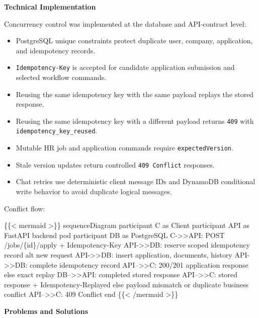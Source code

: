 \vspace{0.5em}\noindent\textbf{Technical Implementation}\par

Concurrency control was implemented at the database and API-contract
level:

\begin{itemize}
\tightlist
\item
  PostgreSQL unique constraints protect duplicate user, company,
  application, and idempotency records.
\item
  \texttt{Idempotency-\allowbreak{}Key} is accepted for candidate application
  submission and selected workflow commands.
\item
  Reusing the same idempotency key with the same payload replays the
  stored response.
\item
  Reusing the same idempotency key with a different payload returns
  \texttt{409} with \texttt{idempotency\_\allowbreak{}key\_\allowbreak{}reused}.
\item
  Mutable HR job and application commands require
  \texttt{expectedVersion}.
\item
  Stale version updates return controlled \texttt{409\ Conflict}
  responses.
\item
  Chat retries use deterministic client message IDs and DynamoDB
  conditional write behavior to avoid duplicate logical messages.
\end{itemize}

Conflict flow:

\{\{\textless{} mermaid \textgreater\}\} sequenceDiagram participant C
as Client participant API as FastAPI backend pod participant DB as
PostgreSQL C-\textgreater\textgreater API: POST /jobs/\{id\}/apply +
Idempotency-Key API-\textgreater\textgreater DB: reserve scoped
idempotency record alt new request API-\textgreater\textgreater DB:
insert application, documents, history API-\textgreater\textgreater DB:
complete idempotency record API--\textgreater\textgreater C: 200/201
application response else exact replay DB--\textgreater\textgreater API:
completed stored response API--\textgreater\textgreater C: stored
response + Idempotency-Replayed else payload mismatch or duplicate
business conflict API--\textgreater\textgreater C: 409 Conflict end
\{\{\textless{} /mermaid \textgreater\}\}

\vspace{0.5em}\noindent\textbf{Problems and Solutions}\par

